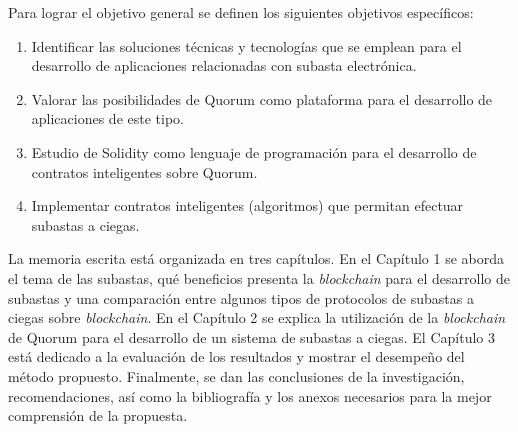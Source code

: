   Para lograr el objetivo general se definen los siguientes objetivos específicos:

  \begin{enumerate}
    \item Identificar las soluciones técnicas y tecnologías que se emplean para el desarrollo de aplicaciones relacionadas 
    con subasta electrónica.

    \item Valorar las posibilidades de Quorum como plataforma para el desarrollo de aplicaciones de este tipo.

    \item Estudio de Solidity como lenguaje de programación para el desarrollo de contratos inteligentes sobre Quorum.

    \item Implementar contratos inteligentes (algoritmos) que permitan efectuar subastas a ciegas.

  \end{enumerate}

  La memoria escrita está organizada en tres capítulos.
  En el Capítulo 1 se aborda el tema de las subastas, qué beneficios presenta la \textit{blockchain} para el desarrollo de subastas y 
  una comparación entre algunos tipos de protocolos de subastas a ciegas sobre \textit{blockchain}. En el Capítulo 2 se explica la 
  utilización de la \textit{blockchain} de Quorum para el desarrollo de un sistema de subastas a ciegas. El Capítulo 3 está dedicado a la 
  evaluación de los resultados y mostrar el desempeño del método propuesto. Finalmente, se dan las conclusiones de la investigación, 
  recomendaciones, así como la bibliografía y los anexos necesarios para la mejor comprensión de la propuesta.
